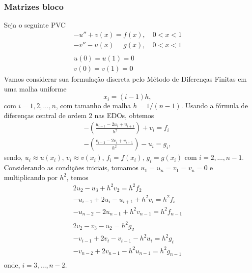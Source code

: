 \subsubsection{Matrizes bloco}

\begin{exer}
  Seja o seguinte PVC
  \begin{gather}
    -u'' + v(x) = f(x),\quad 0<x<1\\
    -v'' - u(x) = g(x),\quad 0<x<1\\
    ~\nonumber\\
    u(0)=u(1)=0\\
    v(0)=v(1)=0
  \end{gather}
  Vamos considerar sua formulação discreta pelo Método de Diferenças Finitas em uma malha uniforme
  \begin{equation}
    x_i = (i-1)h,
  \end{equation}
  com $i=1,2,\dotsc,n$, com tamanho de malha $h = 1/(n-1)$. Usando a fórmula de diferenças central de ordem 2 nas EDOs, obtemos
  \begin{gather}
    -\left(\frac{u_{i-1}-2u_i+u_{i+1}}{h^2}\right) + v_i = f_i\\
    -\left(\frac{v_{i-1}-2v_i+v_{i+1}}{h^2}\right) - u_i = g_i,
  \end{gather}
  sendo, $u_i \approx u(x_i)$, $v_i\approx v(x_i)$, $f_i=f(x_i)$, $g_i = g(x_i)$ com $i=2,\dotsc,n-1$. Considerando as condições iniciais, tomamos $u_1=u_n=v_1=v_n=0$ e multiplicando por $h^2$, temos
  \begin{gather}
    2u_2 - u_3 + h^2v_2 = h^2f_2\\
    -u_{i-1} + 2u_i -u_{i+1} + h^2v_i = h^2f_i\\
    -u_{n-2} + 2u_{n-1} + h^2v_{n-1} = h^2f_{n-1}\\
    ~\nonumber\\
    2v_2 - v_3 - u_2 = h^2g_2\\
    - v_{i-1} + 2v_i -v_{i-1} - h^2u_i = h^2g_i\\
    - v_{n-2} + 2v_{n-1}  - h^2u_{n-1} = h^2g_{n-1}\\    
  \end{gather}
  onde, $i=3,\dotsc,n-2$.


\end{exer}
